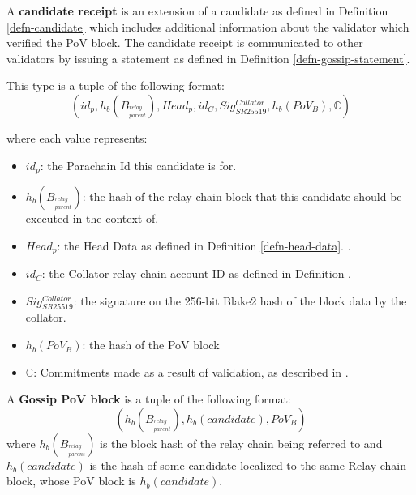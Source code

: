 \begin{definition}
  \label{defn-candidate-receipt}
  A \textbf{candidate receipt} is an extension of a candidate as defined in Definition \ref{defn-candidate}
  which includes additional information about the validator which verified the PoV block.
  The candidate receipt is communicated to other validators by issuing a statement as defined in Definition \ref{defn-gossip-statement}.
  \newline

  This type is a tuple of the following format:
  \[
  (id_p, h_b({B_{^{relay}_{parent}}}), Head_p, id_{C}, Sig^{Collator}_{SR25519}, h_b({PoV_B}), \mathbb{C})
  \]

  where each value represents:
  \begin{itemize}
    \item $id_p$: the Parachain Id this candidate is for.
    \item $h_b({B_{^{relay}_{parent}}})$: the hash of the relay chain block that this
    candidate should be executed in the context of.
    \item $Head_p$: the Head Data as defined in Definition \ref{defn-head-data}.
    .
    \item $id_C$: the Collator relay-chain account ID as defined in Definition
    .
    \item $Sig^{Collator}_{SR25519}$: the signature on the 256-bit Blake2 hash
    of the block data by the collator.
    \item $h_b({PoV_B})$: the hash of the PoV block
    \item $\mathbb{C}$: Commitments made as a result of validation, as described in
    .
  \end{itemize}
\end{definition}

\begin{definition}
  \label{defn-pov-block}
  A \textbf{Gossip PoV block} is a tuple of the following format:
  \[
  (h_b(B_{^{relay}_{parent}}), h_b(candidate), PoV_B)
  \]
  where $h_b(B_{^{relay}_{parent}})$ is the block hash of the relay chain being
  referred to and $h_b(candidate)$ is the hash of some candidate localized to
  the same Relay chain block, whose PoV block is $h_b(candidate)$.
\end{definition}

